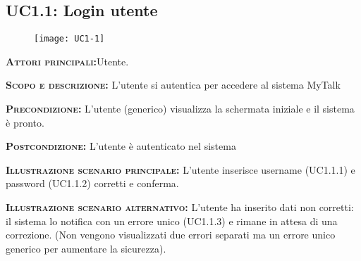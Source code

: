 \subsection{UC1.1: Login utente}
\begin{figure}[H]
\begin{center}
\texttt{[image: UC1-1]}
\caption{}\label{fig:}
\end{center}
\end{figure}
\begin{description}
\item{\scshape\bfseries Attori principali:}Utente.
\item{\scshape\bfseries Scopo e descrizione:} L'utente si autentica per accedere al sistema MyTalk
\item{\scshape\bfseries Precondizione:} L'utente (generico) visualizza la schermata iniziale e il sistema è pronto.
\item{\scshape\bfseries Postcondizione:} L'utente è autenticato nel sistema
\item{\scshape\bfseries Illustrazione scenario principale:} L'utente inserisce username (UC1.1.1) e password (UC1.1.2) corretti e conferma.
\item{\scshape\bfseries Illustrazione scenario alternativo:} L'utente ha inserito dati non corretti: il sistema lo notifica con un errore unico (UC1.1.3) e rimane in attesa di una correzione. (Non vengono visualizzati due errori separati ma un errore unico generico per aumentare la sicurezza).
\end{description}

